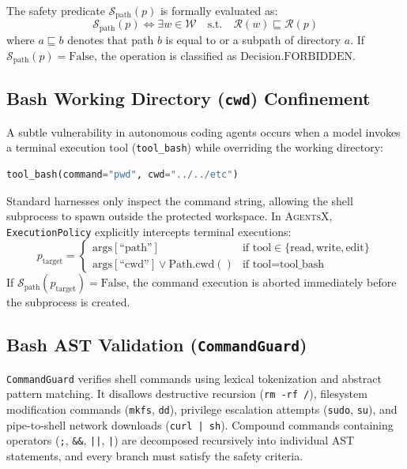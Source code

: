 \documentclass[10pt,twocolumn,letterpaper]{article}
\begin{document}
The safety predicate $\mathcal{S}_{\text{path}}(p)$ is formally evaluated as:
\begin{equation}
\mathcal{S}_{\text{path}}(p) \iff \exists w \in \mathcal{W} \quad \text{s.t.} \quad \mathcal{R}(w) \sqsubseteq \mathcal{R}(p)
\end{equation}
where $a \sqsubseteq b$ denotes that path $b$ is equal to or a subpath of directory $a$. If $\mathcal{S}_{\text{path}}(p) = \text{False}$, the operation is classified as $\text{Decision}.\text{FORBIDDEN}$.

\subsection{Bash Working Directory (\texttt{cwd}) Confinement}
A subtle vulnerability in autonomous coding agents occurs when a model invokes a terminal execution tool (\texttt{tool\_bash}) while overriding the working directory:
\begin{lstlisting}[language=Python]
tool_bash(command="pwd", cwd="../../etc")
\end{lstlisting}
Standard harnesses only inspect the command string, allowing the shell subprocess to spawn outside the protected workspace. In \textsc{AgentsX}, \texttt{ExecutionPolicy} explicitly intercepts terminal executions:
\begin{equation}
p_{\text{target}} = \begin{cases}
    \text{args}[\text{``path''}] & \text{if } \text{tool} \in \{\text{read}, \text{write}, \text{edit}\} \\
    \text{args}[\text{``cwd''}] \lor \text{Path.cwd}() & \text{if } \text{tool} = \text{tool\_bash}
\end{cases}
\end{equation}
If $\mathcal{S}_{\text{path}}(p_{\text{target}}) = \text{False}$, the command execution is aborted immediately before the subprocess is created.

\subsection{Bash AST Validation (\texttt{CommandGuard})}
\texttt{CommandGuard} verifies shell commands using lexical tokenization and abstract pattern matching. It disallows destructive recursion (\texttt{rm -rf /}), filesystem modification commands (\texttt{mkfs}, \texttt{dd}), privilege escalation attempts (\texttt{sudo}, \texttt{su}), and pipe-to-shell network downloads (\texttt{curl | sh}). Compound commands containing operators (\texttt{;}, \texttt{\&\&}, \texttt{||}, \texttt{|}) are decomposed recursively into individual AST statements, and every branch must satisfy the safety criteria.
\end{document}
